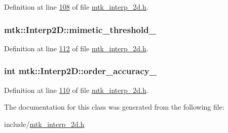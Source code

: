 Definition at line \hyperlink{mtk__interp__2d_8h_source_l00108}{108} of file \hyperlink{mtk__interp__2d_8h_source}{mtk\+\_\+interp\+\_\+2d.\+h}.

\hypertarget{classmtk_1_1Interp2D_a842cfa59a56be76a240dd5de68007134}{
\subsubsection[{mimetic\+\_\+threshold\+\_\+}]{ mtk\+::\+Interp2\+D\+::mimetic\+\_\+threshold\+\_\+\hspace{0.3cm}{\ttfamily [private]}}}\label{classmtk_1_1Interp2D_a842cfa59a56be76a240dd5de68007134}


Definition at line \hyperlink{mtk__interp__2d_8h_source_l00112}{112} of file \hyperlink{mtk__interp__2d_8h_source}{mtk\+\_\+interp\+\_\+2d.\+h}.

\hypertarget{classmtk_1_1Interp2D_ad83cea724e0eff1d8b14bcba3575612e}{
\subsubsection[{order\+\_\+accuracy\+\_\+}]{\setlength{\rightskip}{0pt plus 5cm}int mtk\+::\+Interp2\+D\+::order\+\_\+accuracy\+\_\+\hspace{0.3cm}{\ttfamily [private]}}}\label{classmtk_1_1Interp2D_ad83cea724e0eff1d8b14bcba3575612e}


Definition at line \hyperlink{mtk__interp__2d_8h_source_l00110}{110} of file \hyperlink{mtk__interp__2d_8h_source}{mtk\+\_\+interp\+\_\+2d.\+h}.



The documentation for this class was generated from the following file\+:\begin{DoxyCompactItemize}
\item 
include/\hyperlink{mtk__interp__2d_8h}{mtk\+\_\+interp\+\_\+2d.\+h}\end{DoxyCompactItemize}
